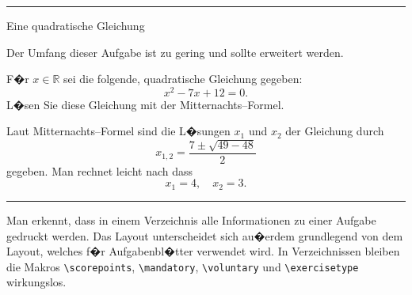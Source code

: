 \vspace*{2em}
\hrule
  \cataloguemode
  \setcounter{exercise}{0}
  \nocontentsline
  \begin{exercise}{Eine quadratische Gleichung}

    \begin{comments}
      Der Umfang dieser Aufgabe ist zu gering und 
      sollte erweitert werden.
    \end{comments}

    \begin{body}
      F�r $x \in \mathbb{R}$ sei die folgende, 
      quadratische Gleichung gegeben:
        \[ x^2 - 7x + 12 = 0. \]
      L�sen Sie diese Gleichung mit der
      Mitternachts--Formel. 
    \end{body}

    \begin{solution}
      Laut Mitternachts--Formel sind die L�sungen 
      $x_1$ und $x_2$ der Gleichung durch
        \[ x_{1,2} = \frac{7 \pm \sqrt{49 - 48}}{2} \]
      gegeben. Man rechnet leicht nach dass
        \[ x_1 = 4,\quad x_2 = 3. \]
    \end{solution}
  \end{exercise}
\hrule
\vspace*{2em}

\noindent
Man erkennt, dass in einem Verzeichnis alle Informationen zu einer Aufgabe gedruckt werden. Das Layout unterscheidet sich au�erdem grundlegend von dem Layout, welches f�r Aufgabenbl�tter verwendet wird. In Verzeichnissen bleiben die Makros \verb|\scorepoints|, \verb|\mandatory|, \verb|\voluntary| und \verb|\exercisetype| wirkungslos.

